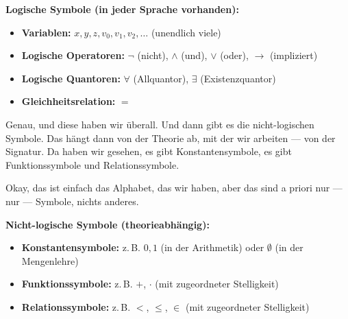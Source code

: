 \begin{math-stroke}
\textbf{Logische Symbole (in jeder Sprache vorhanden):}
\begin{itemize}
    \item \textbf{Variablen:} $x, y, z, v_0, v_1, v_2, \dots$ (unendlich viele)
    \item \textbf{Logische Operatoren:} $\neg$ (nicht), $\wedge$ (und), $\vee$ (oder), $\rightarrow$ (impliziert)
    \item \textbf{Logische Quantoren:} $\forall$ (Allquantor), $\exists$ (Existenzquantor)
    \item \textbf{Gleichheitsrelation:} $=$
\end{itemize}
\end{math-stroke}

\begin{spoken-clean}[00:01:04 - 00:01:27]
Genau, und diese haben wir überall. Und dann gibt es die nicht-logischen Symbole. Das hängt dann von der Theorie ab, mit der wir arbeiten --- von der Signatur. Da haben wir gesehen, es gibt Konstantensymbole, es gibt Funktionssymbole und Relationssymbole. 

Okay, das ist einfach das Alphabet, das wir haben, aber das sind a priori nur --- nur --- Symbole, nichts anderes.
\end{spoken-clean}

\begin{math-stroke}
\textbf{Nicht-logische Symbole (theorieabhängig):}
\begin{itemize}
    \item \textbf{Konstantensymbole:} z.\,B. $0, 1$ (in der Arithmetik) oder $\emptyset$ (in der Mengenlehre)
    \item \textbf{Funktionssymbole:} z.\,B. $+$, $\cdot$ (mit zugeordneter Stelligkeit)
    \item \textbf{Relationssymbole:} z.\,B. $<$, $\le$, $\in$ (mit zugeordneter Stelligkeit)
\end{itemize}

\end{math-stroke}

